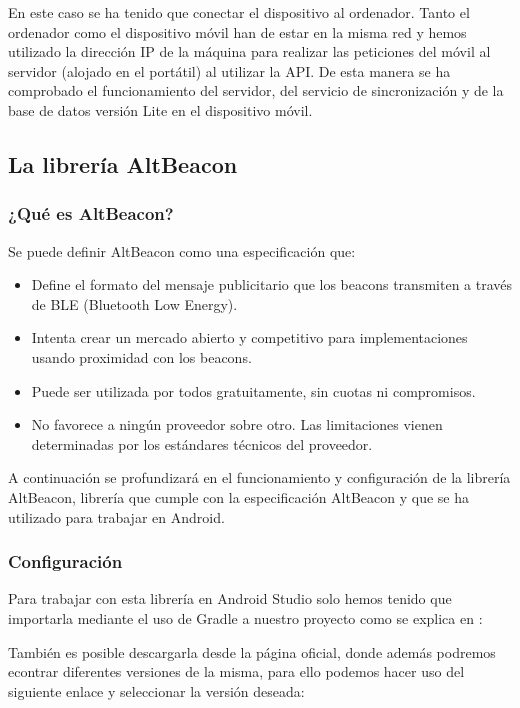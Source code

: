 En este caso se ha tenido que conectar el dispositivo al ordenador. Tanto el ordenador como el dispositivo móvil han de estar en la misma red y hemos utilizado la dirección IP de la máquina para realizar las peticiones del móvil al servidor (alojado en el portátil) al utilizar la API. De esta manera se ha comprobado el funcionamiento del servidor, del servicio de sincronización y de la base de datos versión Lite en el dispositivo móvil.


\subsection{La librería AltBeacon}


\subsubsection{¿Qué es AltBeacon?}

Se puede definir AltBeacon como una especificación que: 

\begin{itemize}
\item Define el formato del mensaje publicitario que los beacons transmiten a través de BLE (Bluetooth Low Energy).
\item Intenta crear un mercado abierto y competitivo para implementaciones usando proximidad con los beacons.
\item Puede ser utilizada por todos gratuitamente, sin cuotas ni compromisos.
\item No favorece a ningún proveedor sobre otro. Las limitaciones vienen determinadas por los estándares técnicos del proveedor.
\end{itemize}

A continuación se profundizará en el funcionamiento y configuración de la librería AltBeacon, librería que cumple con la especificación AltBeacon y que se ha utilizado para trabajar en Android.

\subsubsection{Configuración}

Para trabajar con esta librería en Android Studio solo hemos tenido que importarla mediante el uso de Gradle a nuestro proyecto como se explica en : \cite{URL::importGradle}


También es posible descargarla desde la página oficial, donde además podremos econtrar diferentes versiones de la misma, para ello podemos hacer uso del siguiente enlace y seleccionar la versión deseada:  \cite{URL::versionAltBeacon}



